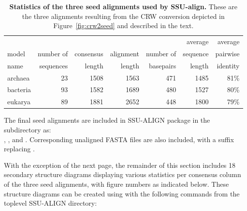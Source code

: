 \begin{table}[ht]
\begin{center}
\begin{tabular}{lrrrrrr} \hline
        &           &           &           &           & average   & average  \\
model   & number of & consensus & alignment & number of & sequence  & pairwise \\
name    & sequences & length    & length    & basepairs & length    & identity \\ \hline
archaea & 23        & 1508      & 1563      & 471       & 1485      & 81\%     \\
bacteria& 93        & 1582      & 1689      & 480       & 1527      & 80\%     \\
eukarya  & 89       & 1881      & 2652      & 448       & 1800      & 79\%     \\ 
\end{tabular}
\caption[Statistics of the three seed alignments used by SSU-align.]
{\textbf{Statistics of the three seed alignments used by
    SSU-align.} These are the three alignments resulting from the
    CRW conversion depicted in Figure~\ref{fig:crw2seed} and
    described in the text.}
\label{tbl:finalseeds}
\end{center}
\end{table}

\newpage 

The final seed alignments are included in SSU-ALIGN package in
the  subdirectory as: \\ ,
, and . Corresponding
unaligned FASTA files are also included, with a  suffix
replacing . 

With the exception of the next page, the remainder of this section
includes 18 secondary structure diagrams displaying various statistics
per consensus column of the three seed alignments, with figure numbers
as indicated below. These structure diagrams can be created using
 with the following commands from the toplevel
SSU-ALIGN directory:


